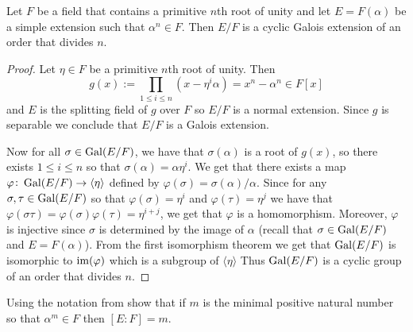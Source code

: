 \documentclass[11pt,a4paper]{article}
\begin{document}
\begin{theorem}
  \label{thm:galois-of-simple-radical-is-cyclic}
  Let $F$ be a field that contains a primitive $n$th root of unity
  and let $E = F(\alpha)$ be a simple extension such that $\alpha^n \in F$.
  Then $E/F$ is a cyclic Galois extension of an order that divides $n$.
\end{theorem}
\begin{proof}
  Let $\eta \in F$ be a primitive $n$th root of unity.
  Then
  \[
    g(x) :=
    \prod_{1 \le i \le n} (x - \eta^i \alpha) =
    x^n - \alpha^n \in F[x]
  \]
  and $E$ is the splitting field of $g$ over $F$ so $E/F$ is a normal
  extension.
  Since $g$ is separable we conclude that $E/F$ is a Galois extension.

  Now for all $\sigma \in \operatorname{Gal}(E/F)$,
  we have that $\sigma(\alpha)$ is a root of $g(x)$,
  so there exists $1 \le i \le n$ so that $\sigma(\alpha) = \alpha \eta^i$.
  We get that there exists a map
  $\varphi \colon \operatorname{Gal}(E/F) \to \langle \eta \rangle$
  defined by $\varphi(\sigma) = \sigma(\alpha)/\alpha$.
  Since for any $\sigma,\tau \in \operatorname{Gal}(E/F)$ 
  so that $\varphi(\sigma) = \eta^i$ and $\varphi(\tau) = \eta^j$ we have that
  $\varphi(\sigma \tau) = \varphi(\sigma) \varphi(\tau) = \eta^{i + j}$,
  we get that $\varphi$ is a homomorphism.
  Moreover, $\varphi$ is injective since $\sigma$ is determined by
  the image of $\alpha$ (recall that $\sigma \in \operatorname{Gal}(E/F)$ and $E = F(\alpha)$).
  From the first isomorphism theorem we get that $\operatorname{Gal}(E/F)$
  is isomorphic to $\operatorname{im}(\varphi)$ which is a subgroup of $\langle \eta \rangle$
  Thus $\operatorname{Gal}(E/F)$ is a cyclic group of an order that divides $n$.
\end{proof}

\begin{exercise}
  Using the notation from 
  show that if $m$ is the minimal positive natural number
  so that $\alpha^m \in F$ then $[E:F] = m$.
\end{exercise}
\end{document}
